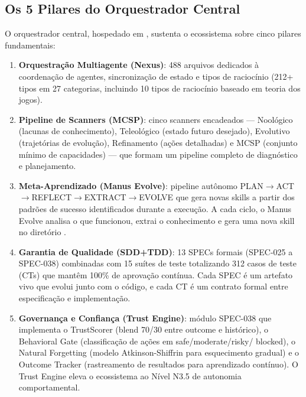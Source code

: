 \subsection{Os 5 Pilares do Orquestrador Central}

O orquestrador central, hospedado em , sustenta o
ecossistema sobre cinco pilares fundamentais:

\begin{enumerate}
  \item \textbf{Orquestração Multiagente (Nexus)}: 488 arquivos dedicados
        à coordenação de agentes, sincronização de estado e tipos de
        raciocínio (212+ tipos em 27 categorias, incluindo 10 tipos de
        raciocínio baseado em teoria dos jogos).
  \item \textbf{Pipeline de Scanners (MCSP)}: cinco scanners encadeados
        --- Noológico (lacunas de conhecimento), Teleológico (estado futuro
        desejado), Evolutivo (trajetórias de evolução), Refinamento (ações
        detalhadas) e MCSP (conjunto mínimo de capacidades) --- que formam
        um pipeline completo de diagnóstico e planejamento.
  \item \textbf{Meta-Aprendizado (Manus Evolve)}: pipeline autônomo
        PLAN$\to$ACT$\to$REFLECT$\to$EXTRACT$\to$EVOLVE que gera novas
        skills a partir dos padrões de sucesso identificados durante a
        execução. A cada ciclo, o Manus Evolve analisa o que funcionou,
        extrai o conhecimento e gera uma nova skill no diretório
        .
  \item \textbf{Garantia de Qualidade (SDD+TDD)}: 13 SPECs formais
        (SPEC-025 a SPEC-038) combinadas com 15 suítes de teste totalizando
        312 casos de teste (CTs) que mantêm 100\% de aprovação contínua.
        Cada SPEC é um artefato vivo que evolui junto com o código, e cada
        CT é um contrato formal entre especificação e implementação.
  \item \textbf{Governança e Confiança (Trust Engine)}: módulo SPEC-038 que
        implementa o TrustScorer (blend 70/30 entre outcome e histórico),
        o Behavioral Gate (classificação de ações em safe/moderate/risky/
        blocked), o Natural Forgetting (modelo Atkinson-Shiffrin para
        esquecimento gradual) e o Outcome Tracker (rastreamento de
        resultados para aprendizado contínuo). O Trust Engine eleva o
        ecossistema ao Nível N3.5 de autonomia comportamental.
\end{enumerate}

